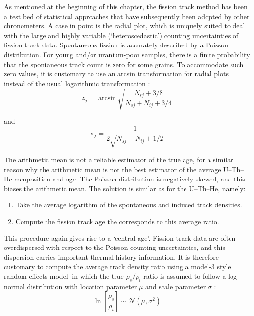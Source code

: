 \begin{refsection}
As mentioned at the beginning of this chapter, the fission track
method has been a test bed of statistical approaches that have
subsequently been adopted by other chronometers. A case in point is
the radial plot, which is uniquely suited to deal with the large and
highly variable (`heteroscedastic') counting uncertainties of fission
track data. Spontaneous fission is accurately described by a Poisson
distribution. For young and/or uranium-poor samples, there is a finite
probability that the spontaneous track count is zero for some grains.
To accommodate such zero values, it is customary to use an arcsin
transformation for radial plots instead of the usual logarithmic
transformation \citep{galbraith1990a}:
\begin{equation}
z_j = \arcsin\sqrt{\frac{N_{sj} + 3/8}{N_{sj}+N_{ij}+3/4}}
\label{eq:zj}
\end{equation}

\noindent and
\begin{equation}
\sigma_j = \frac{1}{2\sqrt{N_{sj}+N_{ij}+1/2}}
\label{eq:sj}
\end{equation}

The arithmetic mean is not a reliable estimator of the true age, for a
similar reason why the arithmetic mean is not the best estimator of
the average U--Th--He composition and age. The Poisson distribution is
negatively skewed, and this biases the arithmetic mean. The solution
is similar as for the U--Th--He, namely:

\begin{enumerate}
\item Take the average logarithm of the spontaneous and induced
  track densities.
\item Compute the fission track age the corresponds to this average
  ratio.
\end{enumerate}

This procedure again gives rise to a `central age'. Fission track data
are often overdispersed with respect to the Poisson counting
uncertainties, and this dispersion carries important thermal history
information. It is therefore customary to compute the average track
density ratio using a model-3 style random effects model, in which the
true $\rho_s/\rho_i$-ratio is assumed to follow a log-normal
distribution with location parameter $\mu$ and scale parameter
$\sigma$ \citep{galbraith1993}:
\begin{equation}
\ln\left[\frac{\rho_s}{\rho_i}\right] \sim \mathcal{N}(\mu,\sigma^2)
\label{eq:logrhosrhoi}
\end{equation}


\end{refsection}
